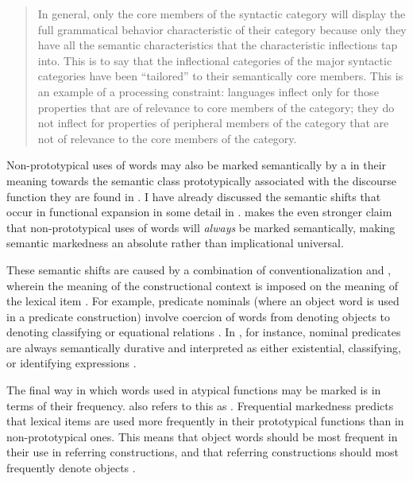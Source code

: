 \blockquote[{\cite[86]{Croft1991}}]{In general, only the core members of the syntactic category will display the full grammatical behavior characteristic of their category because only they have all the semantic characteristics that the characteristic inflections tap into. This is to say that the inflectional categories of the major syntactic categories have been \enquote{tailored} to their semantically core members. This is an example of a processing constraint: languages inflect only for those properties that are of relevance to core members of the category; they do not inflect for properties of peripheral members of the category that are not of relevance to the core members of the category.}

Non-prototypical uses of words may also be marked semantically by a  in their meaning towards the semantic class prototypically associated with the discourse function they are found in \parencites[96]{Croft2000}[73]{Croft2001b}[68]{CroftLier2012}. I have already discussed the semantic shifts that occur in functional expansion in some detail in . \textcite[60--61]{Croft1991} makes the even stronger claim that non-prototypical uses of words will \emph{always} be marked semantically, making semantic markedness an absolute rather than implicational universal.

These semantic shifts are caused by a combination of conventionalization and , wherein the meaning of the constructional context is imposed on the meaning of the lexical item \parencites{Pustejovsky1991}[69, 108]{Croft1991}[252]{PantherThornburg2007}{AudringBooij2016}. For example, predicate nominals (where an object word is used in a predicate construction) involve coercion of words from denoting objects to denoting classifying or equational relations \parencite[69]{Croft1991}. In , for instance, nominal predicates are always semantically durative and interpreted as either existential, classifying, or identifying expressions \parencite[47]{Nakayama2001}.

The final way in which words used in atypical functions may be marked is in terms of their frequency. \textcite[59, 87]{Croft1991} also refers to this as . Frequential markedness predicts that lexical items are used more frequently in their prototypical functions than in non-prototypical ones. This means that object words should be most frequent in their use in referring constructions, and that referring constructions should most frequently denote objects \parencite[87]{Croft1991}.

